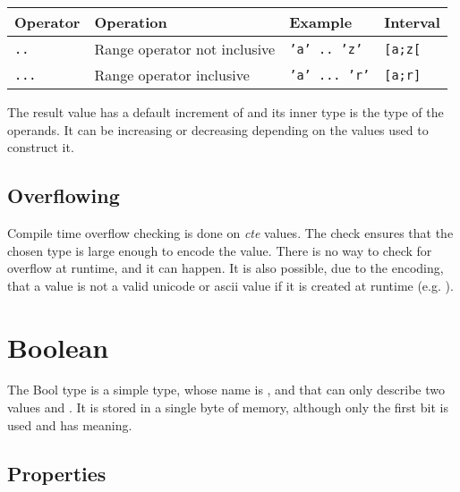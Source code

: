 \begin{itemize}
  \begin{center}
    \vspace{-10pt}\begin{adjustbox}{max width=1.0\linewidth}
      \begin{tabular}{|l|lll|}
        \hline
        Operator & Operation & Example & Interval\\[0pt]
        \hline
        \hline
        \texttt{..} & Range operator not inclusive & \texttt{'a' .. 'z'} & \texttt{[a;z[}\\[0pt]
            \texttt{...} & Range operator inclusive & \texttt{'a' ... 'r'} & \texttt{[a;r]}\\[0pt]
            \hline
      \end{tabular}
  \end{adjustbox}\end{center}


  The result value has a default increment of  and its inner type is
  the type of the operands. It can be increasing or decreasing depending on the
  values used to construct it.

\end{itemize}

\subsection{Overflowing}
\label{sec:orga9c18c5}

Compile time overflow checking is done on \textit{cte} values. The check ensures
that the chosen type is large enough to encode the value. There is no way to
check for overflow at runtime, and it can happen. It is also possible, due to
the encoding, that a value is not a valid unicode or ascii value if it is
created at runtime (e.g. ).

\vfill%
\pagebreak

\section{Boolean}
\label{sec:org9f3a743}

The Bool type is a simple type, whose name is , and that can only
describe two values  and . It is stored in a single
byte of memory, although only the first bit is used and has meaning.

\subsection{Properties}
\label{sec:org503bc9e}

